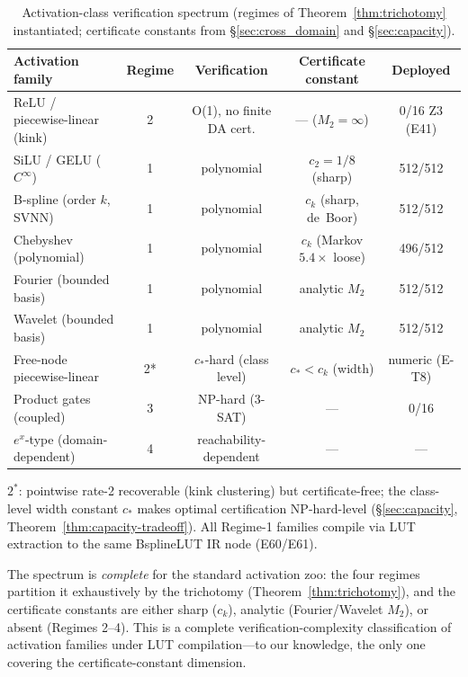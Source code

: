 \begin{table}[t]
\centering
\caption{Activation-class verification spectrum (regimes of
Theorem~\ref{thm:trichotomy} instantiated; certificate constants from
{\S}\ref{sec:cross_domain} and {\S}\ref{sec:capacity}).}
\label{tab:spectrum}
\footnotesize
\begin{tabular}{@{}lcccc@{}}
\toprule
\textbf{Activation family} & \textbf{Regime} & \textbf{Verification} &
\textbf{Certificate constant} & \textbf{Deployed} \\
\midrule
ReLU / piecewise-linear (kink) & 2 & O(1), no finite DA cert. &
--- ($M_2 = \infty$) & 0/16 Z3 (E41) \\
SiLU / GELU ($C^\infty$) & 1 & polynomial & $c_2 = 1/8$ (sharp) & 512/512 \\
B-spline (order $k$, SVNN) & 1 & polynomial & $c_k$ (sharp, de~Boor) & 512/512 \\
Chebyshev (polynomial) & 1 & polynomial & $c_k$ (Markov $5.4\times$ loose) & 496/512 \\
Fourier (bounded basis) & 1 & polynomial & analytic $M_2$ & 512/512 \\
Wavelet (bounded basis) & 1 & polynomial & analytic $M_2$ & 512/512 \\
Free-node piecewise-linear & 2* & $c_*$-hard (class level) & $c_* < c_k$ (width) & numeric (E-T8) \\
Product gates (coupled) & 3 & NP-hard (3-SAT) & --- & 0/16 \\
$e^x$-type (domain-dependent) & 4 & reachability-dependent & --- & --- \\
\bottomrule
\end{tabular}
\vspace{2pt}
{\scriptsize $2^{*}$: pointwise rate-2 recoverable (kink clustering) but
certificate-free; the class-level width constant $c_*$ makes optimal
certification NP-hard-level ({\S}\ref{sec:capacity},
Theorem~\ref{thm:capacity-tradeoff}). All Regime-1 families compile via
LUT extraction to the same BsplineLUT IR node (E60/E61).}
\end{table}

The spectrum is \emph{complete} for the standard activation zoo: the
four regimes partition it exhaustively by the trichotomy
(Theorem~\ref{thm:trichotomy}), and the certificate constants are
either sharp ($c_k$), analytic (Fourier/Wavelet $M_2$), or absent
(Regimes 2--4). This is a complete verification-complexity
classification of activation families under LUT compilation---to our
knowledge, the only one covering the certificate-constant dimension.

